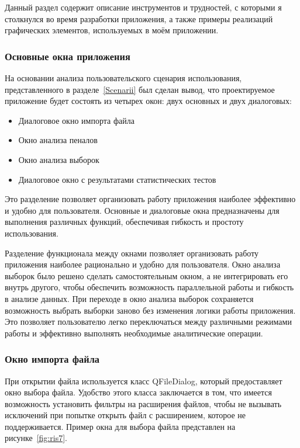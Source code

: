 Данный раздел содержит описание инструментов и трудностей, с которыми я столкнулся во время разработки приложения, а также примеры реализаций графических элементов, используемых в моём приложении.

\subsubsection{Основные окна приложения}

На основании анализа пользовательского сценария использования, представленного в разделе~\ref{Scenarii} был сделан вывод, что проектируемое приложение будет состоять из четырех окон: двух основных и двух диалоговых:

\begin{itemize}
	\item Диалоговое окно импорта файла
	\item Окно анализа пеналов
	\item Окно анализа выборок
	\item Диалоговое окно с результатами статистических тестов 
\end{itemize}

Это разделение позволяет организовать работу приложения наиболее эффективно и удобно для пользователя. Основные и диалоговые окна предназначены для выполнения различных функций, обеспечивая гибкость и простоту использования.

Разделение функционала между окнами позволяет организовать работу приложения наиболее рационально и удобно для пользователя. Окно анализа выборок было решено сделать самостоятельным окном, а не интегрировать его внутрь другого, чтобы обеспечить возможность параллельной работы и гибкость в анализе данных. При переходе в окно анализа выборок сохраняется возможность выбрать выборки заново без изменения логики работы приложения. Это позволяет пользователю легко переключаться между различными режимами работы и эффективно выполнять необходимые аналитические операции.

\subsubsection{Окно импорта файла}

При открытии файла используется класс QFileDialog, который предоставляет окно выбора файла. Удобство этого класса заключается в том, что имеется возможность установить фильтры на расширения файлов, чтобы не вызывать исключений при попытке открыть файл с расширением, которое не поддерживается. Пример окна для выбора файла представлен на рисунке~\ref{fig:ris7}.

